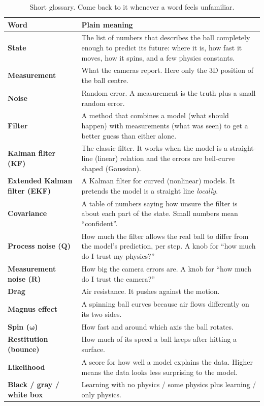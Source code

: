 \documentclass[11pt,a4paper]{article}
\begin{document}
\begin{table}[htbp]
\centering
\small
\renewcommand{\arraystretch}{1.25}
\begin{tabularx}{\textwidth}{@{}>{\bfseries}p{3.2cm}X@{}}
\toprule
Word & Plain meaning \\
\midrule
State & The list of numbers that describes the ball completely enough to predict its future: where it is, how fast it moves, how it spins, and a few physics constants. \\
Measurement & What the cameras report. Here only the 3D position of the ball centre. \\
Noise & Random error. A measurement is the truth plus a small random error. \\
Filter & A method that combines a model (what should happen) with measurements (what was seen) to get a better guess than either alone. \\
Kalman filter (KF) & The classic filter. It works when the model is a straight-line (linear) relation and the errors are bell-curve shaped (Gaussian). \\
Extended Kalman filter (EKF) & A Kalman filter for curved (nonlinear) models. It pretends the model is a straight line \emph{locally}. \\
Covariance & A table of numbers saying how unsure the filter is about each part of the state. Small numbers mean ``confident''. \\
Process noise ($\mathbf Q$) & How much the filter allows the real ball to differ from the model's prediction, per step. A knob for ``how much do I trust my physics?'' \\
Measurement noise ($\mathbf R$) & How big the camera errors are. A knob for ``how much do I trust the camera?'' \\
Drag & Air resistance. It pushes against the motion. \\
Magnus effect & A spinning ball curves because air flows differently on its two sides. \\
Spin ($\boldsymbol\omega$) & How fast and around which axis the ball rotates. \\
Restitution (bounce) & How much of its speed a ball keeps after hitting a surface. \\
Likelihood & A score for how well a model explains the data. Higher means the data looks less surprising to the model. \\
Black / gray / white box & Learning with no physics / some physics plus learning / only physics. \\
\bottomrule
\end{tabularx}
\caption{Short glossary. Come back to it whenever a word feels unfamiliar.}
\end{table}
\end{document}
